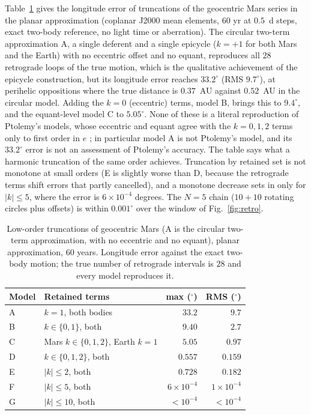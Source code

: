 Table~\ref{tab:ptolemy} gives the longitude error of truncations of the
geocentric Mars series in the planar approximation (coplanar J2000 mean
elements, $60$ yr at $0.5$~d steps, exact two-body reference, no light time or
aberration). The circular two-term approximation A, a single deferent and a single epicycle
($k=+1$ for both Mars and the Earth) with no eccentric offset and no equant,
reproduces all $28$ retrograde
loops of the true motion, which is the qualitative achievement of the epicycle
construction, but its longitude error reaches $33.2^\circ$ (RMS $9.7^\circ$), at perihelic
oppositions where the true distance is $0.37$~AU against $0.52$~AU in the
circular model. Adding the $k=0$ (eccentric) terms, model B, brings this to
$9.4^\circ$, and the equant-level model C to $5.05^\circ$. None of
these is a literal reproduction of Ptolemy's models, whose eccentric and equant
agree with the $k=0,1,2$ terms only to first order in $e$
\cite{Evans1984,Evans1988}; in particular model A is not Ptolemy's model, and
its $33.2^\circ$ error is not an assessment of Ptolemy's accuracy. The table says what a harmonic truncation of the
same order achieves. Truncation by retained set is not monotone at small
orders (E is slightly worse than D, because the retrograde terms shift errors
that partly cancelled), and a monotone decrease sets in only for
$|k|\le5$, where the error is $6\times10^{-4}$ degrees. The $N=5$ chain
($10+10$ rotating circles plus offsets) is within $0.001^\circ$ over the window of
Fig.~\ref{fig:retro}.

\begin{table}[H]
\caption{Low-order truncations of geocentric Mars (A is the circular two-term
approximation, with no eccentric and no equant), planar approximation,
$60$ years. Longitude error against the exact two-body motion; the true
number of retrograde intervals is $28$ and every model reproduces it.}
\label{tab:ptolemy}
\begin{ruledtabular}
\begin{tabular}{llrr}
Model & Retained terms & max ($^\circ$) & RMS ($^\circ$)\\
\hline
A & $k=1$, both bodies & $33.2$ & $9.7$\\
B & $k\in\{0,1\}$, both & $9.40$ & $2.7$\\
C & Mars $k\in\{0,1,2\}$, Earth $k=1$ & $5.05$ & $0.97$\\
D & $k\in\{0,1,2\}$, both & $0.557$ & $0.159$\\
E & $|k|\le2$, both & $0.728$ & $0.182$\\
F & $|k|\le5$, both & $6\times10^{-4}$ & $1\times10^{-4}$\\
G & $|k|\le10$, both & $<10^{-4}$ & $<10^{-4}$\\
\end{tabular}
\end{ruledtabular}
\end{table}

